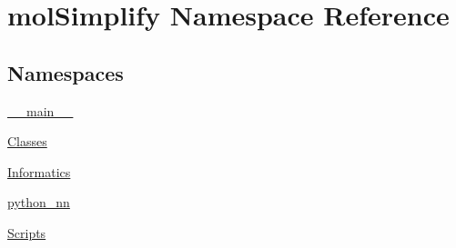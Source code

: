 \hypertarget{namespacemolSimplify}{}\section{mol\+Simplify Namespace Reference}
\label{namespacemolSimplify}
\subsection*{Namespaces}
\begin{DoxyCompactItemize}
\item 
 \hyperlink{namespacemolSimplify_1_1____main____}{\+\_\+\+\_\+main\+\_\+\+\_\+}
\item 
 \hyperlink{namespacemolSimplify_1_1Classes}{Classes}
\item 
 \hyperlink{namespacemolSimplify_1_1Informatics}{Informatics}
\item 
 \hyperlink{namespacemolSimplify_1_1python__nn}{python\+\_\+nn}
\item 
 \hyperlink{namespacemolSimplify_1_1Scripts}{Scripts}
\end{DoxyCompactItemize}
